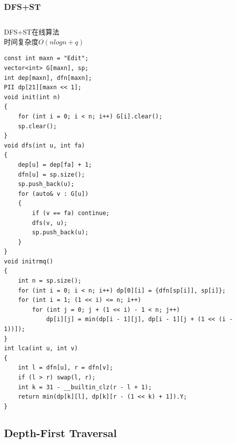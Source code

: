 \documentclass[twoside]{article}
\begin{document}
\subsubsection{DFS+ST}
\begin{lstlisting}
\end{lstlisting}
DFS+ST在线算法\\
时间复杂度$O(nlogn+q)$
\begin{lstlisting}
const int maxn = "Edit";
vector<int> G[maxn], sp;
int dep[maxn], dfn[maxn];
PII dp[21][maxn << 1];
void init(int n)
{
    for (int i = 0; i < n; i++) G[i].clear();
    sp.clear();
}
void dfs(int u, int fa)
{
    dep[u] = dep[fa] + 1;
    dfn[u] = sp.size();
    sp.push_back(u);
    for (auto& v : G[u])
    {
        if (v == fa) continue;
        dfs(v, u);
        sp.push_back(u);
    }
}
void initrmq()
{
    int n = sp.size();
    for (int i = 0; i < n; i++) dp[0][i] = {dfn[sp[i]], sp[i]};
    for (int i = 1; (1 << i) <= n; i++)
        for (int j = 0; j + (1 << i) - 1 < n; j++)
            dp[i][j] = min(dp[i - 1][j], dp[i - 1][j + (1 << (i - 1))]);
}
int lca(int u, int v)
{
    int l = dfn[u], r = dfn[v];
    if (l > r) swap(l, r);
    int k = 31 - __builtin_clz(r - l + 1);
    return min(dp[k][l], dp[k][r - (1 << k) + 1]).Y;
}
\end{lstlisting}
\subsection{Depth-First Traversal}
\end{document}
